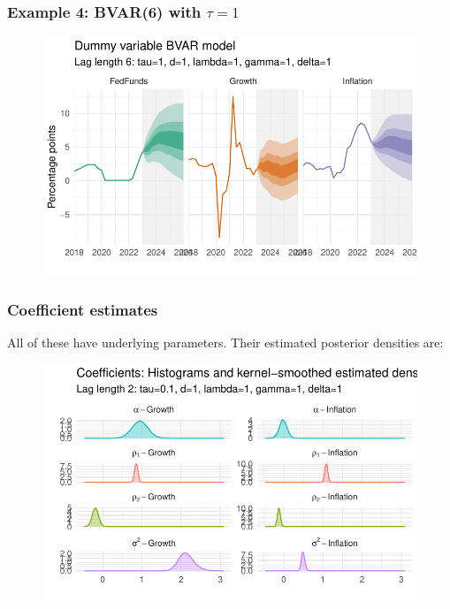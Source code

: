 \documentclass[
  letterpaper,
]{book}
\begin{document}
\hypertarget{example-4-bvar6-with-tau1}{%
\subsubsection{\texorpdfstring{Example 4: BVAR(6) with
\(\tau=1\)}{Example 4: BVAR(6) with \textbackslash tau=1}}\label{example-4-bvar6-with-tau1}}

\begin{figure}

{\centering \includegraphics{./BVAR_files/figure-pdf/estim-1.pdf}

}

\end{figure}

\hypertarget{coefficient-estimates}{%
\subsubsection{Coefficient estimates}\label{coefficient-estimates}}

All of these have underlying parameters. Their estimated posterior
densities are:

\begin{figure}

{\centering \includegraphics{./BVAR_files/figure-pdf/unnamed-chunk-9-1.pdf}

}

\end{figure}
\end{document}

